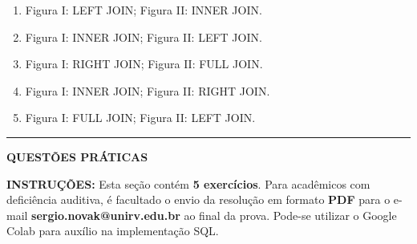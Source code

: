 \documentclass[12pt,a4paper]{article}
\begin{document}
\begin{enumerate}
    \begin{center}
        \hspace{2.5cm}
    \end{center}

    \begin{enumerate}[label=\Alph*)]
        \item Figura I: LEFT JOIN; Figura II: INNER JOIN.
        \item Figura I: INNER JOIN; Figura II: LEFT JOIN.
        \item Figura I: RIGHT JOIN; Figura II: FULL JOIN.
        \item Figura I: INNER JOIN; Figura II: RIGHT JOIN.
        \item Figura I: FULL JOIN; Figura II: LEFT JOIN.
    \end{enumerate}

\end{enumerate}
\vspace{0.5cm}
\newpage
\begin{center}
    \rule{\textwidth}{0.4pt}
    \textbf{QUESTÕES PRÁTICAS}
\end{center}

\vspace{0.2cm}

\textbf{INSTRUÇÕES:} Esta seção contém \textbf{5 exercícios}. Para acadêmicos com deficiência auditiva, é facultado o envio da resolução em formato \textbf{PDF} para o e-mail \textbf{sergio.novak@unirv.edu.br} ao final da prova. Pode-se utilizar o Google Colab para auxílio na implementação SQL.
\end{document}
